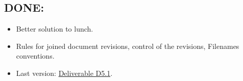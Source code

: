 \subsection{DONE:}
\begin{itemize}
    \item Better solution to lunch.
    \item Rules for joined document revisions, control of the revisions, Filenames conventions.
    \item Last version: \href{https://www.dropbox.com/home/998%20-%20neurotwin.eu%20repository/05%20-%20Deliverables?preview=NEUROTWIN+Deliverable+-+D5.1+Quality+Guide_v1.7_CG.docx}{Deliverable D5.1}.
\end{itemize}